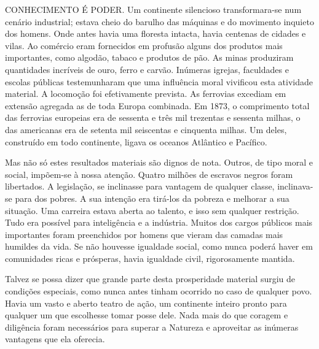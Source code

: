 \documentclass[11pt,a5paper,twoside,openany]{book}
\begin{document}
CONHECIMENTO É PODER. Um continente silencioso transformara-se num cenário industrial; estava cheio do barulho das máquinas e do movimento inquieto dos homens. Onde antes havia uma floresta intacta, havia centenas de cidades e vilas. Ao comércio eram fornecidos em profusão alguns dos produtos mais importantes, como algodão, tabaco e produtos de pão. As minas produziram quantidades incríveis de ouro, ferro e carvão. Inúmeras igrejas, faculdades e escolas públicas testemunharam que uma influência moral vivificou esta atividade material. A locomoção foi efetivamente prevista. As ferrovias excediam em extensão agregada as de toda Europa combinada. Em 1873, o comprimento total das ferrovias europeias era de sessenta e três mil trezentas e sessenta milhas, o das americanas era de setenta mil seiscentas e cinquenta milhas. Um deles, construído em todo continente, ligava os oceanos Atlântico e Pacífico.

Mas não só estes resultados materiais são dignos de nota. Outros, de tipo moral e social, impõem-se à nossa atenção. Quatro milhões de escravos negros foram libertados. A legislação, se inclinasse para vantagem de qualquer classe, inclinava-se para dos pobres. A sua intenção era tirá-los da pobreza e melhorar a sua situação. Uma carreira estava aberta ao talento, e isso sem qualquer restrição. Tudo era possível para inteligência e a indústria. Muitos dos cargos públicos mais importantes foram preenchidos por homens que vieram das camadas mais humildes da vida. Se não houvesse igualdade social, como nunca poderá haver em comunidades ricas e prósperas, havia igualdade civil, rigorosamente mantida.

Talvez se possa dizer que grande parte desta prosperidade material surgiu de condições especiais, como nunca antes tinham ocorrido no caso de qualquer povo. Havia um vasto e aberto teatro de ação, um continente inteiro pronto para qualquer um que escolhesse tomar posse dele. Nada mais do que coragem e diligência foram necessários para superar a Natureza e aproveitar as inúmeras vantagens que ela oferecia.
\end{document}
